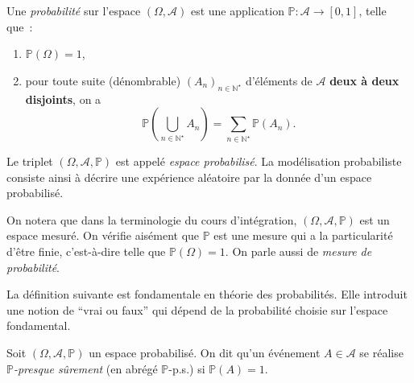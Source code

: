 \begin{definition}[{Probabilité}]\label{I-defproba}

Une \emph{probabilité} sur l'espace \((\Omega, \mathcal{A})\) est une
application \(\mathbb{P}: \mathcal{A}\rightarrow [0,1]\), telle que~:

\begin{enumerate}
\def\labelenumi{\arabic{enumi}.}
\tightlist
\item
  \(\mathbb{P}(\Omega) = 1\),
\item
  pour toute suite (dénombrable) \((A_n)_{n\in\mathbb{N}^\star}\)
  d'éléments de \(\mathcal{A}\) \textbf{deux à deux disjoints}, on a
  \begin{equation*}
   \mathbb{P}\left(\bigcup_{n\in\mathbb{N}^\star} A_n\right) = \sum_{n\in\mathbb{N}^\star} \mathbb{P}(A_n).
   \end{equation*}
\end{enumerate}
\end{definition}

Le triplet \((\Omega, \mathcal{A}, \mathbb{P})\) est appelé \emph{espace
probabilisé}. La modélisation probabiliste consiste ainsi à décrire une
expérience aléatoire par la donnée d'un espace probabilisé.

On notera que dans la terminologie du cours d'intégration,
\((\Omega, \mathcal{A}, \mathbb{P})\) est un espace mesuré. On vérifie
aisément que \(\mathbb{P}\) est une mesure qui a la particularité d'être
finie, c'est-à-dire telle que \(\mathbb{P}(\Omega) =1\). On parle aussi
de \emph{mesure de probabilité}.

La définition suivante est fondamentale en théorie des probabilités.
Elle introduit une notion de ``vrai ou faux'' qui dépend de la
probabilité choisie sur l'espace fondamental.

\begin{definition}\label{I-propriuxe9tuxe9-presque-suxfbre}

Soit \((\Omega, \mathcal{A}, \mathbb{P})\) un espace probabilisé. On dit
qu'un événement \(A\in\mathcal{A}\) se réalise
\emph{\(\mathbb{P}\)-presque sûrement} (en abrégé \(\mathbb{P}\)-p.s.)
si \(\mathbb{P}(A) = 1\).
\end{definition}

